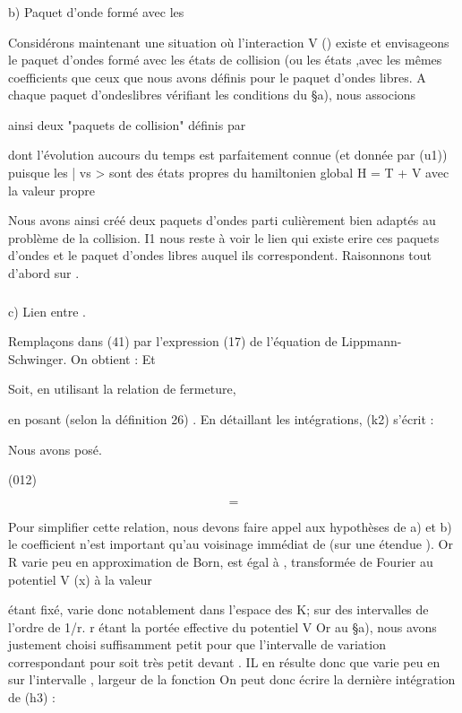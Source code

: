 \subsubsection{}%
b) Paquet d'onde formé avec les

Considérons maintenant une situation où l'interaction V ()
existe et envisageons le paquet d'ondes formé avec les états de collision
 (ou les états ,avec les mêmes coefficients  que
ceux que nous avons définis pour le paquet d'ondes libres. A chaque paquet
d'ondeslibres  vérifiant les conditions du \S a), nous associons

ainsi deux "paquets de collision"  définis par


dont l'évolution aucours du temps est parfaitement connue (et donnée par
(u1)) puisque les | vs > sont des états propres du hamiltonien global
H = T + V avec la valeur propre 

Nous avons ainsi créé deux paquets d'ondes  parti
culièrement bien adaptés au problème de la collision. I1 nous reste à voir
le lien qui existe erire ces paquets d'ondes et le paquet d'ondes libres
 auquel ils correspondent. Raisonnons tout d'abord sur .
 
\subsubsection{}%
c) Lien entre .

Remplaçons dans (41) par l'expression (17) de l'équation de Lippmann-Schwinger. On obtient : Et

Soit, en utilisant la relation de fermeture,

en posant
 (selon la définition 26) .
En détaillant les intégrations, (k2) s'écrit :

Nous avons posé.

%
(012)

\[
\tag{45}=
\]


Pour simplifier cette relation, nous devons faire appel aux hypothèses
de a) et b)  le coefficient  n'est important qu'au voisinage
immédiat de  (sur une étendue ). Or R  varie peu en
 approximation de Born,  est égal
à , transformée de Fourier au potentiel V (x) à la valeur

 étant fixé,  varie donc notablement dans
l'espace des K; sur des intervalles de l'ordre de 1/r. r étant la portée
effective du potentiel V Or au \S a), nous avons justement choisi 
suffisamment petit pour que l'intervalle de variation correspondant pour
 soit très petit devant . IL en résulte donc que 
varie peu en  sur l'intervalle , largeur de la fonction  On
peut donc écrire la dernière intégration de (h3) :

